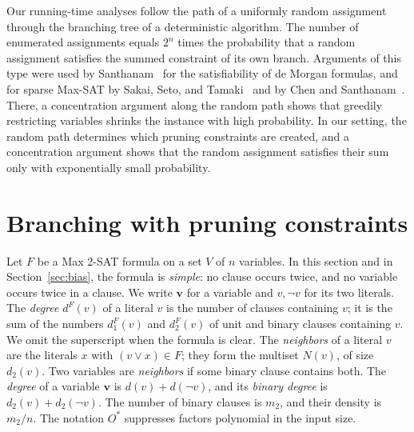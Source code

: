 \documentclass[11pt,a4paper]{article}
\theoremstyle{definition}
\theoremstyle{remark}
\newcommand{\Ostar}{O^{*}}
\begin{document}
Our running-time analyses follow the path of a uniformly random
assignment through the branching tree of a deterministic algorithm. The
number of enumerated assignments equals $2^n$ times the probability that
a random assignment satisfies the summed constraint of its own branch.
Arguments of this type were used by Santhanam~\cite{shrinkage} for the
satisfiability of de Morgan formulas, and for sparse Max-SAT by Sakai,
Seto, and Tamaki~\cite{max_sat_width_reduction} and by Chen and
Santhanam~\cite{best_sparse_maxsat}. There, a concentration argument
along the random path shows that greedily restricting variables shrinks
the instance with high probability. In our setting, the random path
determines which pruning constraints are created, and a concentration
argument shows that the random assignment satisfies their sum only with
exponentially small probability.


\section{Branching with pruning constraints}\label{sec:framework}

Let $F$ be a Max 2-SAT formula on a set $V$ of $n$ variables. In this
section and in Section~\ref{sec:bias}, the formula is \emph{simple}: no
clause occurs twice, and no variable occurs twice in a clause. We write
$\mathbf v$ for a variable and $v,\neg v$ for its two literals. The
\emph{degree} $d^F(v)$ of a literal $v$ is the number of clauses containing
$v$; it is the sum of the numbers $d_1^F(v)$ and $d_2^F(v)$ of unit and
binary clauses containing $v$. We omit the superscript when the formula is
clear. The \emph{neighbors} of a literal $v$ are the literals $x$ with
$(v\vee x)\in F$; they form the multiset $N(v)$, of size $d_2(v)$. Two
variables are \emph{neighbors} if some binary clause contains both. The
\emph{degree} of a variable $\mathbf v$ is $d(v)+d(\neg v)$, and its
\emph{binary degree} is $d_2(v)+d_2(\neg v)$. The number of binary clauses
is $m_2$, and their density is $m_2/n$. The notation $\Ostar$ suppresses
factors polynomial in the input size.
\end{document}
